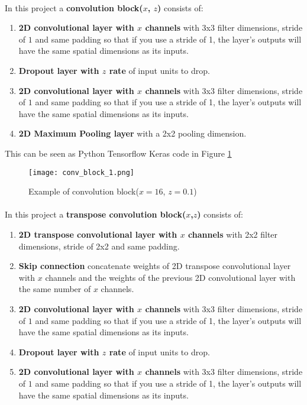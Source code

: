 \paragraph{}
In this project a \textbf{convolution block($x$, $z$)} consists of:
    \begin{enumerate}
        \item \textbf{2D convolutional layer with $x$ channels} with $3$x$3$ filter dimensions, stride of $1$ and same padding so that if you use a stride of 1, the layer's outputs will have the same spatial dimensions as its inputs.
        \item \textbf{Dropout layer with $z$ rate} of input units to drop.
        \item \textbf{2D convolutional layer with $x$ channels} with $3$x$3$ filter dimensions, stride of $1$ and same padding so that if you use a stride of 1, the layer's outputs will have the same spatial dimensions as its inputs.
        \item \textbf{2D Maximum Pooling layer} with a 2x2 pooling dimension.
    \end{enumerate}
This can be seen as Python Tensorflow Keras code in Figure \ref{conv_block_1}
\begin{figure}[hbt!]
    \centering
    \texttt{[image: conv\_block\_1.png]}
    \caption{Example of convolution block($x=16$, $z=0.1$)}
    \label{conv_block_1}
\end{figure}

\paragraph{}
In this project a \textbf{transpose convolution block($x$,$z$)} consists of:
    \begin{enumerate}
        \item \textbf{2D transpose convolutional layer with $x$ channels} with 2x2 filter dimensions, stride of 2x2 and same padding.
        \item \textbf{Skip connection} concatenate weights of 2D transpose convolutional layer with $x$ channels and the weights of the previous 2D convolutional layer with the same number of $x$ channels.
        \item \textbf{2D convolutional layer with $x$ channels} with $3$x$3$ filter dimensions, stride of $1$ and same padding so that if you use a stride of 1, the layer's outputs will have the same spatial dimensions as its inputs.
        \item \textbf{Dropout layer with $z$ rate} of input units to drop.
        \item \textbf{2D convolutional layer with $x$ channels} with $3$x$3$ filter dimensions, stride of $1$ and same padding so that if you use a stride of 1, the layer's outputs will have the same spatial dimensions as its inputs.
    \end{enumerate}  

